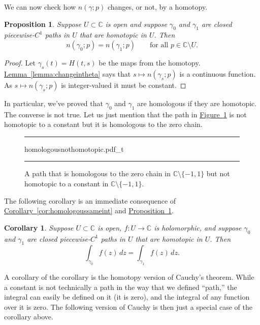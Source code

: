 \documentclass[12pt,openany]{book}
\newcommand{\C}{{\mathbb{C}}}
\newcommand{\myquote}[1]{``#1''}
\theoremstyle{plain}
\newtheorem{prop}[thm]{Proposition}
\newtheorem{cor}[thm]{Corollary}
\theoremstyle{remark}
\theoremstyle{definition}
\newenvironment{myfig}{%
\begin{figure}[h!t]
\noindent\rule{\textwidth}{0.5pt}\vspace{12pt}\par\centering}%
{\par\noindent\rule{\textwidth}{0.5pt}
\end{figure}}
\theoremstyle{exercise}
\theoremstyle{example}
\newcommand{\figureref}[1]{\hyperref[#1]{Figure~\ref*{#1}}}
\newcommand{\propref}[1]{\hyperref[#1]{Proposition~\ref*{#1}}}
\newcommand{\lemmaref}[1]{\hyperref[#1]{Lemma~\ref*{#1}}}
\newcommand{\corref}[1]{\hyperref[#1]{Corollary~\ref*{#1}}}
\begin{document}
We can now check how $n(\gamma;p)$ changes, or not, by a homotopy.

\begin{prop} \label{prop:homotopicmeanshomologous}
Suppose $U \subset \C$ is open and suppose $\gamma_0$ and $\gamma_1$ are closed
piecewise-$C^1$ paths in $U$ that are homotopic in $U$.  Then
\begin{equation*}
n(\gamma_0;p) = n(\gamma_1;p) \qquad \text{for all } p \in \C \setminus U .
\end{equation*}
\end{prop}

\begin{proof}
Let $\gamma_s(t) = H(t,s)$ be the maps from the homotopy.
\lemmaref{lemma:changeintheta} says that $s \mapsto n(\gamma_s;p)$ is a
continuous function.  As $s \mapsto n(\gamma_s;p)$ is integer-valued it must
be constant.
\end{proof}

In particular, we've proved that $\gamma_0$ and $\gamma_1$ are homologous if
they are homotopic.  The converse is not true.  Let us just mention that 
the path in \figureref{fig:homologousnothomotopic} 
is not homotopic to a constant but it is homologous to the zero chain.

\begin{myfig}
{homologousnothomotopic.pdf_t}
\caption{A path that is homologous to the zero chain in $\C \setminus \{
-1,1\}$ but not homotopic to a constant in
$\C \setminus \{ -1,1 \}$.\label{fig:homologousnothomotopic}}
\end{myfig}

The following corollary is an immediate consequence
of \corref{cor:homologoussameint} and
\propref{prop:homotopicmeanshomologous}.

\begin{cor}
Suppose $U \subset \C$ is open, $f \colon U \to \C$ is holomorphic,
and suppose $\gamma_0$ and $\gamma_1$ are closed
piecewise-$C^1$ paths in $U$ that are homotopic in $U$.  Then
\begin{equation*}
\int_{\gamma_0} f(z) \, dz = \int_{\gamma_1} f(z) \, dz .
\end{equation*}
\end{cor}

A corollary of the corollary is the homotopy version of Cauchy's theorem.
While a constant is not technically a path in the way that we defined
\myquote{path,} the integral can easily be defined on it (it is zero),
and the integral of any function over it is zero.
The following version of Cauchy
is then just a special case of the corollary above.
\end{document}
